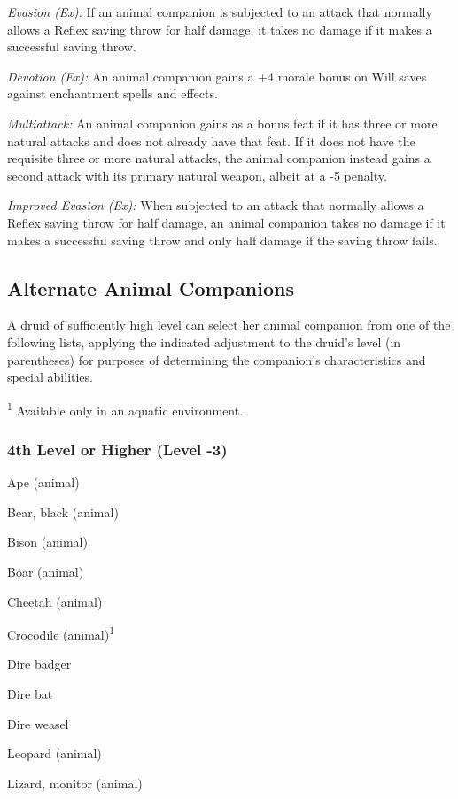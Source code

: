 \textit{Evasion (Ex):} If an animal companion is subjected to an attack that normally 
allows a Reflex saving throw for half damage, it takes no damage if it makes a 
successful saving throw.

\textit{Devotion (Ex):} An animal companion gains a +4 morale bonus on Will saves 
against enchantment spells and effects.

\textit{Multiattack:} An animal companion gains  as a bonus feat if 
it has three or more natural attacks and does not already have that feat. If it 
does not have the requisite three or more natural attacks, the animal companion 
instead gains a second attack with its primary natural weapon, albeit at a -5 penalty.

\textit{Improved Evasion (Ex):} When subjected to an attack that normally allows 
a Reflex saving throw for half damage, an animal companion takes no damage if it 
makes a successful saving throw and only half damage if the saving throw fails.

\subsection{Alternate Animal Companions}

A druid of sufficiently high level can select her animal companion from one of 
the following lists, applying the indicated adjustment to the druid's level (in 
parentheses) for purposes of determining the companion's characteristics and special 
abilities.

\textsuperscript{1} Available only in an aquatic environment.

\subsubsection{4th Level or Higher (Level -3)}

Ape (animal) 

Bear, black (animal) 

Bison (animal)

Boar (animal) 

Cheetah (animal) 

Crocodile (animal)\textsuperscript{1}

Dire badger 

Dire bat

Dire weasel

Leopard (animal)

Lizard, monitor (animal)

